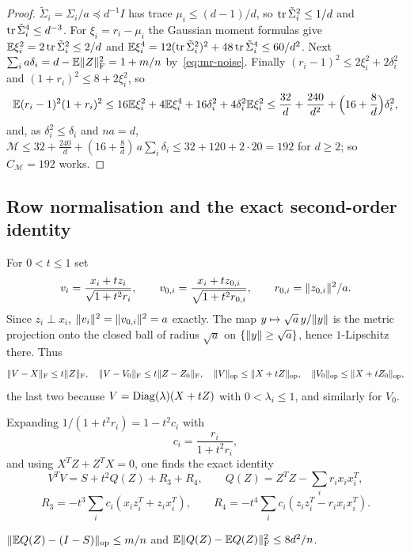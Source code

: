 \begin{proof}
$\tilde\Sigma_i=\Sigma_i/a\preceq d^{-1}I$ has trace $\mu_i\le(d-1)/d$, so
$\operatorname{tr}\tilde\Sigma_i^2\le1/d$ and $\operatorname{tr}\tilde\Sigma_i^4\le d^{-3}$. For
$\xi_i=r_i-\mu_i$ the Gaussian moment formulas give $\mathbb E\xi_i^2=2\operatorname{tr}\tilde\Sigma_i^2\le
2/d$ and $\mathbb E\xi_i^4=12(\operatorname{tr}\tilde\Sigma_i^2)^2+48\operatorname{tr}\tilde\Sigma_i^4\le60/d^2$.
Next $\sum_ia\delta_i=d-\mathbb E\lVert Z\rVert_{\mathrm F}^2=1+m/n$ by~\eqref{eq:mr-noise}. Finally
$(r_i-1)^2\le2\xi_i^2+2\delta_i^2$ and $(1+r_i)^2\le8+2\xi_i^2$, so
\[
 \mathbb E(r_i-1)^2(1+r_i)^2\le16\mathbb E\xi_i^2+4\mathbb E\xi_i^4+16\delta_i^2+4\delta_i^2\mathbb E\xi_i^2
 \le\frac{32}d+\frac{240}{d^2}+\Bigl(16+\frac8d\Bigr)\delta_i^2 ,
\]
and, as $\delta_i^2\le\delta_i$ and $na=d$,
$\mathcal M\le32+\frac{240}d+(16+\frac8d)\,a\sum_i\delta_i\le32+120+2\cdot20=192$
for $d\ge2$; so $C_{\mathcal M}=192$ works.
\end{proof}

\subsection{Row normalisation and the exact second-order identity}

For $0<t\le1$ set
\[
 v_i=\frac{x_i+tz_i}{\sqrt{1+t^2r_i}},\qquad
 v_{0,i}=\frac{x_i+tz_{0,i}}{\sqrt{1+t^2r_{0,i}}},\qquad
 r_{0,i}=\lVert z_{0,i}\rVert^2/a .
\]
Since $z_i\perp x_i$, $\lVert v_i\rVert^2=\lVert v_{0,i}\rVert^2=a$ exactly. The map
$y\mapsto\sqrt a\,y/\lVert y\rVert$ is the metric projection onto the closed ball of
radius $\sqrt a$ on $\{\lVert y\rVert\ge\sqrt a\}$, hence $1$-Lipschitz there. Thus
\begin{equation}\label{eq:mr-contract}
 \lVert V-X\rVert_{\mathrm F}\le t\lVert Z\rVert_{\mathrm F},\quad \lVert V-V_0\rVert_{\mathrm F}\le t\lVert Z-Z_0\rVert_{\mathrm F},\quad
 \lVert V\rVert_{\mathrm{op}}\le\lVert X+tZ\rVert_{\mathrm{op}},\quad\lVert V_0\rVert_{\mathrm{op}}\le\lVert X+tZ_0\rVert_{\mathrm{op}},
\end{equation}
the last two because $V=\operatorname{Diag}(\lambda)(X+tZ)$ with $0<\lambda_i\le1$, and similarly
for $V_0$.

Expanding $1/(1+t^2r_i)=1-t^2c_i$ with
\[
 c_i=\frac{r_i}{1+t^2r_i},
\]
and using $X^TZ+Z^TX=0$, one finds the exact identity
\begin{equation}\label{eq:mr-identity}
 V^TV=S+t^2Q(Z)+R_3+R_4,\qquad Q(Z)=Z^TZ-\sum_ir_ix_ix_i^T,
\end{equation}
\[
 R_3=-t^3\sum_ic_i(x_iz_i^T+z_ix_i^T),\qquad
 R_4=-t^4\sum_ic_i(z_iz_i^T-r_ix_ix_i^T).
\]

\begin{lemma}\label{lem:Q}
$\lVert \mathbb E Q(Z)-(I-S)\rVert_{\mathrm{op}}\le m/n$ and $\mathbb E\lVert Q(Z)-\mathbb E Q(Z)\rVert_{\mathrm F}^2\le8d^2/n$.
\end{lemma}

